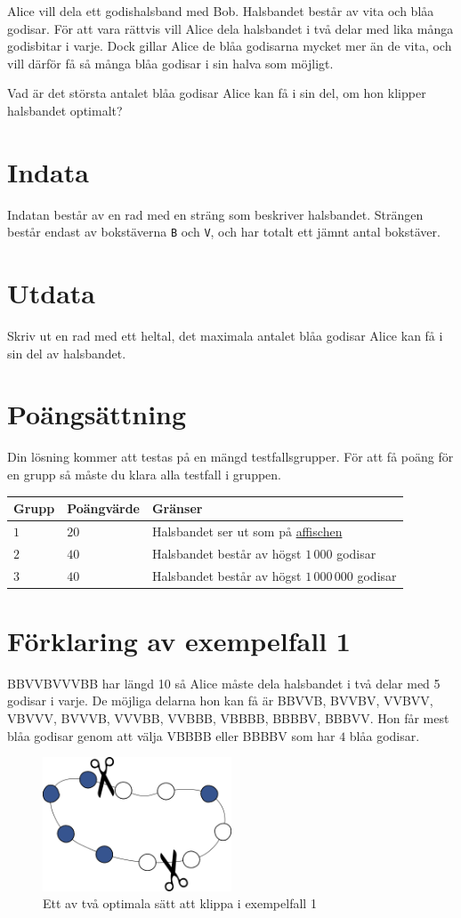 Alice vill dela ett godishalsband med Bob.
Halsbandet består av vita och blåa godisar.
För att vara rättvis vill Alice dela halsbandet i två
delar med lika många godisbitar i varje.
Dock gillar Alice de blåa godisarna mycket mer än de vita,
och vill därför få så många blåa godisar i sin halva som möjligt.

Vad är det största antalet blåa godisar Alice kan få i sin del,
om hon klipper halsbandet optimalt?

\section*{Indata}
Indatan består av en rad med en sträng som beskriver halsbandet.
Strängen består endast av bokstäverna \texttt{B} och \texttt{V},
och har totalt ett jämnt antal bokstäver.

\section*{Utdata}
Skriv ut en rad med ett heltal, det maximala antalet blåa godisar Alice
kan få i sin del av halsbandet.

\section*{Poängsättning}
Din lösning kommer att testas på en mängd testfallsgrupper.
För att få poäng för en grupp så måste du klara alla testfall i gruppen.

\noindent
\begin{tabular}{| l | l | l |}
\hline
Grupp & Poängvärde & Gränser \\ \hline
$1$   & $20$       & Halsbandet ser ut som på \href{https://www.progolymp.se/2020/affisch.pdf}{affischen} \\ \hline
$2$   & $40$       & Halsbandet består av högst $1\,000$ godisar\\ \hline
$3$   & $40$       & Halsbandet består av högst $1\,000\,000$ godisar \\ \hline
\end{tabular}

\section*{Förklaring av exempelfall 1}
BBVVBVVVBB har längd 10 så Alice måste dela halsbandet i två delar med 5 godisar i varje.
De möjliga delarna hon kan få är BBVVB, BVVBV, VVBVV, VBVVV, BVVVB, VVVBB, VVBBB, VBBBB, BBBBV, BBBVV.
Hon får mest blåa godisar genom att välja VBBBB eller BBBBV som har $4$ blåa godisar.

\begin{figure}[h]
	\centering
\includegraphics[width=0.5\textwidth]{sample1}
\caption{Ett av två optimala sätt att klippa i exempelfall 1}
\end{figure}
